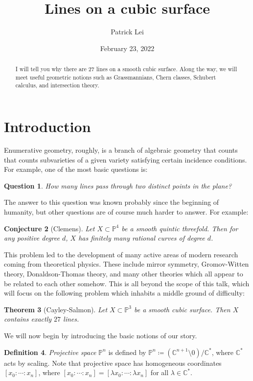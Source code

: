 \documentclass{amsart}
\title{Lines on a cubic surface}
\author{Patrick Lei}
\date{February 23, 2022}
\newtheorem{thm}{Theorem}[section]
\newtheorem{conj}[thm]{Conjecture}
\newtheorem{quest}[thm]{Question}
\theoremstyle{definition}
\newtheorem{defn}[thm]{Definition}
\theoremstyle{remark}
\theoremstyle{plain}
\theoremstyle{definition}
\theoremstyle{remark}
\newcommand{\C}{\mathbb{C}}
\renewcommand{\P}{\mathbb{P}}
\newcommand{\1}{\mathbf{1}}
\newcommand{\2}{\mathbf{2}}
\newcommand{\3}{\mathbf{3}}
\begin{document}
    
\maketitle

\begin{abstract}
    I will tell you why there are 27 lines on a smooth cubic surface. Along the way, we will meet useful geometric notions such as Grassmannians, Chern classes, Schubert calculus, and intersection theory.
\end{abstract}

\section{Introduction}

Enumerative geometry, roughly, is a branch of algebraic geometry that counts that counts subvarieties of a given variety satisfying certain incidence conditions. For example, one of the most basic questions is:

\begin{quest}
    How many lines pass through two distinct points in the plane?
\end{quest}

The answer to this question was known probably since the beginning of humanity, but other questions are of course much harder to answer. For example:

\begin{conj}[Clemens]
    Let $X \subset \P^4$ be a smooth quintic threefold. Then for any positive degree $d$, $X$ has finitely many rational curves of degree $d$.
\end{conj}

This problem led to the development of many active areas of modern research coming from theoretical physics. These include mirror symmetry, Gromov-Witten theory, Donaldson-Thomas theory, and many other theories which all appear to be related to each other somehow. This is all beyond the scope of this talk, which will focus on the following problem which inhabits a middle ground of difficulty:

\begin{thm}[Cayley-Salmon]
    Let $X \subset \P^3$ be a smooth cubic surface. Then $X$ contains exactly $27$ lines.
\end{thm}

We will now begin by introducing the basic notions of our story.
\begin{defn}
    \textit{Projective space} $\P^n$ is defined by $\P^n \coloneqq (\C^{n+1} \setminus 0) / \C^*$, where $\C^*$ acts by scaling. Note that projective space has homogeneous coordinates $[x_0:\cdots:x_n]$, where $[x_0:\cdots:x_n] = [\lambda x_0: \cdots : \lambda x_n]$ for all $\lambda \in \C^*$.
\end{defn}
\end{document}
